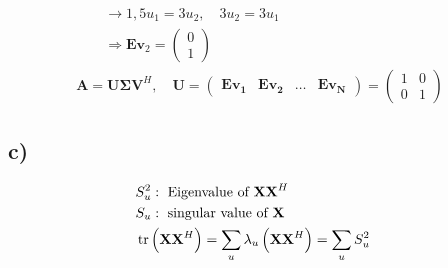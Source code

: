 \begin{align*}
	&\qquad\rightarrow 1,5u_{1}=3u_{2},\quad 3u_{2}=3u_{1}& \\
	&\qquad\Rightarrow\mathbf{Ev}_{2}=\begin{pmatrix}0\\1\end{pmatrix}& \\
	&\mathbf{A=U\Sigma V}^{H},\quad\mathbf{U}=\begin{pmatrix}\mathbf{Ev_{1}} & \mathbf{Ev_{2}} & \ldots & \mathbf{Ev_{N}}\end{pmatrix}=
	\begin{pmatrix}
	1 & 0 \\
	0 & 1
	\end{pmatrix}&
\end{align*}

\subsection*{c)}
\begin{align*}
	&S_{u}^{2}:\text{ Eigenvalue of }\mathbf{XX}^{H}& \\
	&S_{u}:\text{ singular value of }\mathbf{X}& \\
	&\operatorname{tr}\left(\mathbf{XX}^{H}\right)=\sum_{u}\lambda_{u}\left(\mathbf{XX}^{H}\right)=\sum_{u}S_{u}^{2}&
\end{align*}

